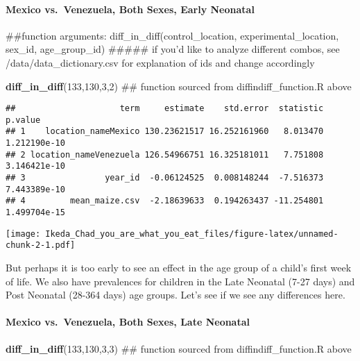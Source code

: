 \documentclass[]{article}
\newenvironment{Shaded}{\begin{snugshade}}{\end{snugshade}}
\newcommand{\KeywordTok}[1]{\textcolor[rgb]{0.13,0.29,0.53}{\textbf{#1}}}
\newcommand{\DecValTok}[1]{\textcolor[rgb]{0.00,0.00,0.81}{#1}}
\newcommand{\NormalTok}[1]{#1}
\let\oldparagraph\paragraph
\renewcommand{\paragraph}[1]{\oldparagraph{#1}\mbox{}}
\begin{document}
\paragraph{Mexico vs.~Venezuela, Both Sexes, Early
Neonatal}\label{mexico-vs.venezuela-both-sexes-early-neonatal}

\begin{Shaded}
\begin{Highlighting}[]
\NormalTok{##function arguments: diff_in_diff(control_location, experimental_location, sex_id, age_group_id)}
\NormalTok{##### if you'd like to analyze different combos, see /data/data_dictionary.csv for explanation of ids and change accordingly}

\KeywordTok{diff_in_diff}\NormalTok{(}\DecValTok{133}\NormalTok{,}\DecValTok{130}\NormalTok{,}\DecValTok{3}\NormalTok{,}\DecValTok{2}\NormalTok{) ## function sourced from diffindiff_function.R above}
\end{Highlighting}
\end{Shaded}

\begin{verbatim}
##                     term     estimate    std.error  statistic      p.value
## 1    location_nameMexico 130.23621517 16.252161960   8.013470 1.212190e-10
## 2 location_nameVenezuela 126.54966751 16.325181011   7.751808 3.146421e-10
## 3                year_id  -0.06124525  0.008148244  -7.516373 7.443389e-10
## 4         mean_maize.csv  -2.18639633  0.194263437 -11.254801 1.499704e-15
\end{verbatim}

\texttt{[image: Ikeda\_Chad\_you\_are\_what\_you\_eat\_files/figure-latex/unnamed-chunk-2-1.pdf]}

But perhaps it is too early to see an effect in the age group of a
child's first week of life. We also have prevalences for children in the
Late Neonatal (7-27 days) and Post Neonatal (28-364 days) age groups.
Let's see if we see any differences here.

\paragraph{Mexico vs.~Venezuela, Both Sexes, Late
Neonatal}\label{mexico-vs.venezuela-both-sexes-late-neonatal}

\begin{Shaded}
\begin{Highlighting}[]
\KeywordTok{diff_in_diff}\NormalTok{(}\DecValTok{133}\NormalTok{,}\DecValTok{130}\NormalTok{,}\DecValTok{3}\NormalTok{,}\DecValTok{3}\NormalTok{) ## function sourced from diffindiff_function.R above}
\end{Highlighting}
\end{Shaded}
\end{document}
